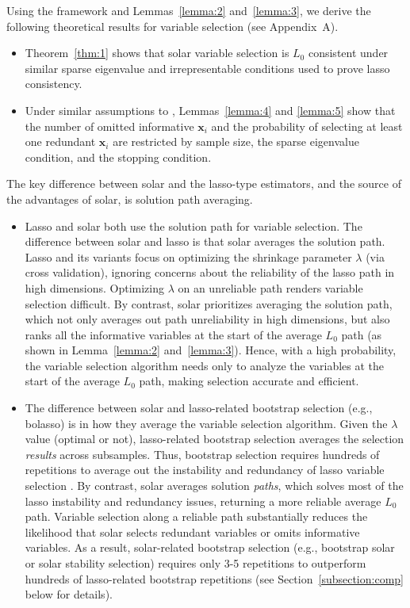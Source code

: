 \documentclass[11pt,review,authoryear]{elsarticle}
\begin{document}
Using the \citet{zhang09} framework and Lemmas~\ref{lemma:2} and~\ref{lemma:3}, we derive the following theoretical results for variable selection (see Appendix~A).

\begin{itemize}
  \item Theorem~\ref{thm:1} shows that solar variable selection is $L_0$ consistent under similar sparse eigenvalue and irrepresentable conditions used to prove lasso consistency.
  \item Under similar assumptions to \citet{zhang09}, Lemmas~\ref{lemma:4} and \ref{lemma:5} show that the number of omitted informative $\mathbf{x}_i$ and the probability of selecting at least one redundant $\mathbf{x}_i$ are restricted by sample size, the sparse eigenvalue condition, and the stopping condition.
\end{itemize}

The key difference between solar and the lasso-type estimators, and the source of the advantages of solar, is solution path averaging.
%
\begin{itemize}
  \item Lasso and solar both use the solution path for variable selection. The difference between solar and lasso is that solar averages the solution path. Lasso and its variants focus on optimizing the shrinkage parameter $\lambda$ (via cross validation), ignoring concerns about the reliability of the lasso path in high dimensions. Optimizing $\lambda$ on an unreliable path renders variable selection difficult. By contrast, solar  prioritizes averaging the solution path, which not only averages out  path unreliability in high dimensions, but also ranks all the informative variables at the start of the average $L_0$ path (as shown in Lemma~\ref{lemma:2} and~\ref{lemma:3}). Hence, with a high probability, the variable selection algorithm needs only to analyze the variables at the start of the average $L_0$ path, making selection accurate and efficient.
  \item The difference between solar and lasso-related bootstrap selection (e.g., bolasso) is in how they average the variable selection algorithm. Given the $\lambda$ value (optimal or not), lasso-related bootstrap selection averages the selection \emph{results} across subsamples. Thus, bootstrap selection requires hundreds of repetitions to average out the instability and redundancy of lasso variable selection \citep{bach2008bolasso}. By contrast, solar averages solution \emph{paths}, which solves most of the lasso instability and redundancy issues, returning a more reliable average $L_0$ path. Variable selection along a reliable path substantially reduces the likelihood that solar selects redundant variables or omits informative variables. As a result, solar-related bootstrap selection (e.g., bootstrap solar or solar stability selection) requires only 3-5 repetitions to outperform hundreds of lasso-related bootstrap repetitions (see Section~\ref{subsection:comp} below for details).
\end{itemize}
\end{document}
